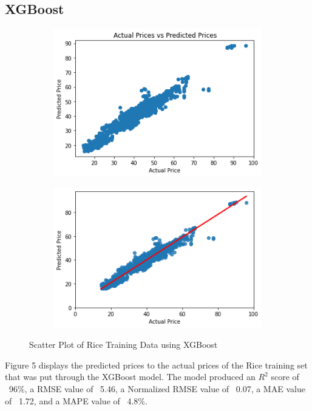 \documentclass[runningheads]{llncs}
\begin{document}
\subsection{XGBoost}
\;
\begin{figure}
	\begin{subfigure}{.5\textwidth}
		\centering
		\includegraphics[width=.8\linewidth]{FIGURES/xgb_train1.png}
		
	\end{subfigure}%
	\begin{subfigure}{.5\textwidth}
		\centering
		\includegraphics[width=.8\linewidth]{FIGURES/xgb_train2.png}
		
	\end{subfigure}
	\caption{Scatter Plot of Rice Training Data using XGBoost}
\end{figure}

Figure 5 displays the predicted prices to the actual prices of the Rice training set that was put through the XGBoost model. The model produced an $R^2$ score of ~96\%, a RMSE value of ~5.46, a Normalized RMSE value of ~0.07, a MAE value of ~1.72, and a MAPE value of ~4.8\%.
\end{document}

